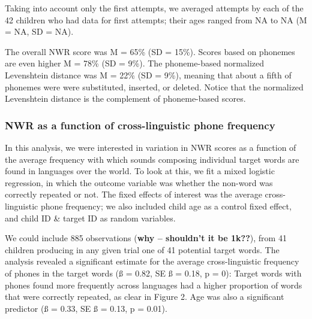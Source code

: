 \documentclass[english,,man,floatsintext]{apa6}
\begin{document}
Taking into account only the first attempts, we averaged attempts by each of the 42 children who had data for first attempts; their ages ranged from NA to NA (M = NA, SD = NA).

The overall NWR score was M = 65\% (SD = 15\%). Scores based on phonemes are even higher M = 78\% (SD = 9\%). The phoneme-based normalized Levenshtein distance was M = 22\% (SD = 9\%), meaning that about a fifth of phonemes were were substituted, inserted, or deleted. Notice that the normalized Levenshtein distance is the complement of phoneme-based scores.

\hypertarget{nwr-as-a-function-of-cross-linguistic-phone-frequency}{%
\subsubsection{NWR as a function of cross-linguistic phone frequency}\label{nwr-as-a-function-of-cross-linguistic-phone-frequency}}

In this analysis, we were interested in variation in NWR scores as a function of the average frequency with which sounds composing individual target words are found in languages over the world. To look at this, we fit a mixed logistic regression, in which the outcome variable was whether the non-word was correctly repeated or not. The fixed effects of interest was the average cross-linguistic phone frequency; we also included child age as a control fixed effect, and child ID \& target ID as random variables.

We could include 885 observations (\textbf{why -- shouldn't it be 1k??}), from 41 children producing in any given trial one of 41 potential target words. The analysis revealed a significant estimate for the average cross-linguistic frequency of phones in the target words (ß = 0.82, SE ß = 0.18, p = 0): Target words with phones found more frequently across languages had a higher proportion of words that were correctly repeated, as clear in Figure 2. Age was also a significant predictor (ß = 0.33, SE ß = 0.13, p = 0.01).
\end{document}
